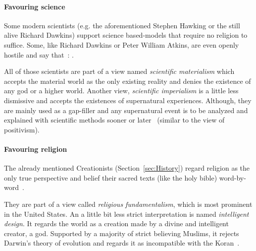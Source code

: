 
\paragraph{Favouring science}
Some modern scientists (e.g. the aforementioned Stephen Hawking or the still alive Richard Dawkins) support science based-models that require no religion to suffice.
Some, like Richard Dawkins or Peter William Atkins, are even openly hostile and say that~\cite{dawkins2006god}: .

All of those scientists are part of a view named \emph{scientific materialism} which accepts the material world as the only existing reality and denies the existence of any god or a higher world.
Another view, \emph{scientific imperialism} is a little less dismissive and accepts the existences of supernatural experiences.
Although, they are mainly used as a gap-filler and any supernatural event is to be analyzed and explained with scientific methods sooner or later~\cite{krishna1971gopi} (similar to the view of positivism). %


\paragraph{Favouring religion}
The already mentioned Creationists (Section~\ref{sec:History}) regard religion as the only true perspective and belief their sacred texts (like the holy bible) word-by-word~\cite{Hameed1637}.

They are part of a view called \emph{religious fundamentalism}, which is most prominent in the United States.
An a little bit less strict interpretation is named \emph{intelligent design}. It regards the world as a creation made by a divine and intelligent creator, a god.
Supported by a majority of strict believing Muslims, it rejects Darwin's theory of evolution and regards it as incompatible with the Koran~\cite{Demirci2016}.


